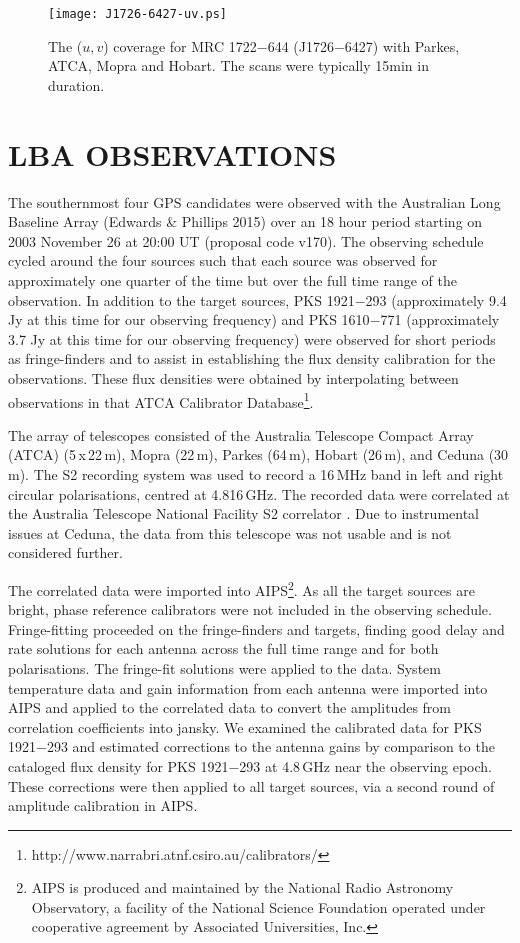 \documentclass{pasa}%
\begin{document}
\begin{figure}
\begin{center}
\texttt{[image: J1726-6427-uv.ps]}
\caption{The ($u,v$) coverage for MRC 1722$-$644 (J1726$-$6427) with Parkes, ATCA, Mopra and Hobart.
The scans were typically 15min in duration.}\label{Fig1}
\end{center}
\end{figure}

\section{LBA OBSERVATIONS}

The southernmost four GPS candidates were observed with the Australian
Long Baseline Array (Edwards \& Phillips 2015) over an 18 hour period
starting on 2003 November 26 at 20:00 UT (proposal code v170). The
observing schedule cycled around the four sources such that each
source was observed for approximately one quarter of the time but over
the full time range of the observation.  In addition to the target
sources, PKS 1921$-$293 (approximately 9.4 Jy at this time for our
observing frequency) and PKS 1610$-$771 (approximately 3.7 Jy at this
time for our observing frequency) were observed for short periods as
fringe-finders and to assist in establishing the flux density
calibration for the observations.
These flux densities were obtained
by interpolating between observations in that ATCA Calibrator
Database\footnote{http://www.narrabri.atnf.csiro.au/calibrators/}.


The array of telescopes consisted of
the Australia Telescope Compact Array (ATCA) (5\,x\,22\,m), Mopra
(22\,m), Parkes (64\,m), Hobart (26\,m), and Ceduna (30\,m).  The S2
recording system was used to record a 16\,MHz band in left and right
circular polarisations, centred at 4.816\,GHz.  The recorded data were
correlated at the Australia Telescope National Facility S2 correlator
\cite{wil96}.
Due to instrumental issues at Ceduna, the data from this telescope was
not usable and is not considered further.

The correlated data were imported into AIPS\footnote{AIPS is produced
  and maintained by the National Radio Astronomy Observatory, a
  facility of the National Science Foundation operated under
  cooperative agreement by Associated Universities, Inc.}.  As all the
target sources are bright, phase reference calibrators were not
included in the observing schedule.  Fringe-fitting proceeded on the
fringe-finders and targets, finding good delay and rate solutions for
each antenna across the full time range and for both polarisations.
The fringe-fit solutions were applied to the data.  System temperature
data and gain information from each antenna were imported into AIPS
and applied to the correlated data to convert the amplitudes from
correlation coefficients into jansky.  We examined the calibrated data for
PKS 1921$-$293 and estimated corrections to the antenna gains by
comparison to the cataloged flux density for PKS 1921$-$293 at 4.8\,GHz
near the observing epoch.  These corrections were then applied to all
target sources, via a second round of amplitude calibration in AIPS.
\end{document}
